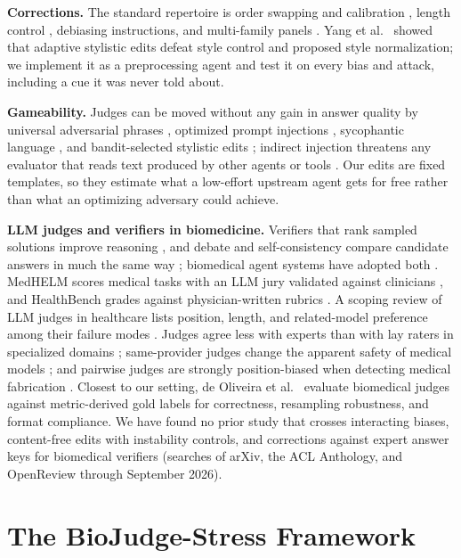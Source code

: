 \documentclass[conference]{IEEEtran}
\begin{document}
\textbf{Corrections.} The standard repertoire is order swapping and calibration \cite{b8,b9}, length control \cite{b12}, debiasing instructions, and multi-family panels \cite{b29}. Yang et al.~\cite{b21} showed that adaptive stylistic edits defeat style control and proposed style normalization; we implement it as a preprocessing agent and test it on every bias and attack, including a cue it was never told about.

\textbf{Gameability.} Judges can be moved without any gain in answer quality by universal adversarial phrases \cite{b20}, optimized prompt injections \cite{b19}, sycophantic language \cite{b30}, and bandit-selected stylistic edits \cite{b21}; indirect injection threatens any evaluator that reads text produced by other agents or tools \cite{b31}. Our edits are fixed templates, so they estimate what a low-effort upstream agent gets for free rather than what an optimizing adversary could achieve.

\textbf{LLM judges and verifiers in biomedicine.} Verifiers that rank sampled solutions improve reasoning \cite{b32,b33}, and debate and self-consistency compare candidate answers in much the same way \cite{b34,b35}; biomedical agent systems have adopted both \cite{b1,b2}. MedHELM scores medical tasks with an LLM jury validated against clinicians \cite{b6}, and HealthBench grades against physician-written rubrics \cite{b7}. A scoping review of LLM judges in healthcare lists position, length, and related-model preference among their failure modes \cite{b51}. Judges agree less with experts than with lay raters in specialized domains \cite{b36}; same-provider judges change the apparent safety of medical models \cite{b50}; and pairwise judges are strongly position-biased when detecting medical fabrication \cite{b52}. Closest to our setting, de Oliveira et al.~\cite{b49} evaluate biomedical judges against metric-derived gold labels for correctness, resampling robustness, and format compliance. We have found no prior study that crosses interacting biases, content-free edits with instability controls, and corrections against expert answer keys for biomedical verifiers (searches of arXiv, the ACL Anthology, and OpenReview through September 2026).

\section{The BioJudge-Stress Framework}
\end{document}
